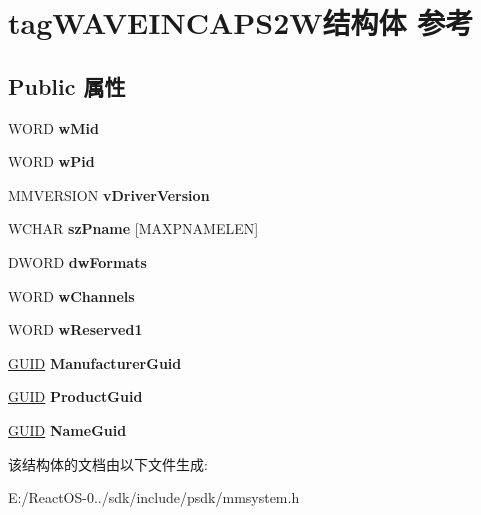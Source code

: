 \hypertarget{structtag_w_a_v_e_i_n_c_a_p_s2_w}{}\section{tag\+W\+A\+V\+E\+I\+N\+C\+A\+P\+S2\+W结构体 参考}
\label{structtag_w_a_v_e_i_n_c_a_p_s2_w}
\subsection*{Public 属性}
\begin{DoxyCompactItemize}
\item 
\mbox{\label{structtag_w_a_v_e_i_n_c_a_p_s2_w_aa9d63ead128a69e6a2b3210138ae3377}} 
W\+O\+RD {\bfseries w\+Mid}
\item 
\mbox{\label{structtag_w_a_v_e_i_n_c_a_p_s2_w_aca44e416627bf8c4386131c7cbf515e8}} 
W\+O\+RD {\bfseries w\+Pid}
\item 
\mbox{\label{structtag_w_a_v_e_i_n_c_a_p_s2_w_a2ff08b0b70f7b0115be35159873780b0}} 
M\+M\+V\+E\+R\+S\+I\+ON {\bfseries v\+Driver\+Version}
\item 
\mbox{\label{structtag_w_a_v_e_i_n_c_a_p_s2_w_a4880c56c4c33d446547d87ca0191b4ae}} 
W\+C\+H\+AR {\bfseries sz\+Pname} \mbox{[}M\+A\+X\+P\+N\+A\+M\+E\+L\+EN\mbox{]}
\item 
\mbox{\label{structtag_w_a_v_e_i_n_c_a_p_s2_w_a26744308839d64a4fbcd55f66e3444f5}} 
D\+W\+O\+RD {\bfseries dw\+Formats}
\item 
\mbox{\label{structtag_w_a_v_e_i_n_c_a_p_s2_w_aa61101bcb3fc49d863c69c0ef89bedf5}} 
W\+O\+RD {\bfseries w\+Channels}
\item 
\mbox{\label{structtag_w_a_v_e_i_n_c_a_p_s2_w_ac30d64761b3f03cede3ee0b703007252}} 
W\+O\+RD {\bfseries w\+Reserved1}
\item 
\mbox{\label{structtag_w_a_v_e_i_n_c_a_p_s2_w_a22a6a83bcd10dbb68830f467ad4d910d}} 
\hyperlink{interface_g_u_i_d}{G\+U\+ID} {\bfseries Manufacturer\+Guid}
\item 
\mbox{\label{structtag_w_a_v_e_i_n_c_a_p_s2_w_a93d959b7a8978c250b080951a1bfb55b}} 
\hyperlink{interface_g_u_i_d}{G\+U\+ID} {\bfseries Product\+Guid}
\item 
\mbox{\label{structtag_w_a_v_e_i_n_c_a_p_s2_w_a40a30bbcb05f59647b0b3d2b5b60591e}} 
\hyperlink{interface_g_u_i_d}{G\+U\+ID} {\bfseries Name\+Guid}
\end{DoxyCompactItemize}


该结构体的文档由以下文件生成\+:\begin{DoxyCompactItemize}
\item 
E\+:/\+React\+O\+S-\/0../sdk/include/psdk/mmsystem.\+h\end{DoxyCompactItemize}

